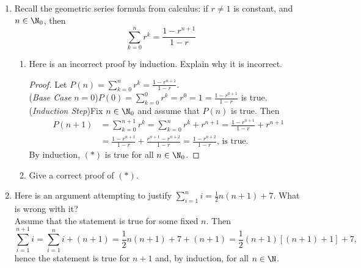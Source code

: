 \begin{exercises}{}{}
\begin{enumerate}
	\item Recall the geometric series formula from calculus: if $r\neq 1$ is constant, and $n\in\N_0$, then
	\[\sum_{k=0}^nr^k=\frac{1-r^{n+1}}{1-r}\tag*{$(\ast)$}\]
	\begin{enumerate}
	  \item Here is an incorrect proof by induction. Explain why it is incorrect.
	  \begin{proof}
	  Let $P(n)=\sum\limits_{k=0}^nr^k=\frac{1-r^{n+1}}{1-r}$.\\
	  (\emph{Base Case} $n=0$)\quad $P(0)=\sum\limits_{k=0}^0r^k=r^0=1=\frac{1-r^{0+1}}{1-r}$ is true.\\
	  (\emph{Induction Step})\quad Fix $n\in\N_0$ and assume that $P(n)$ is true. Then
	  \begin{align*}
	  P(n+1)&=\sum_{k=0}^{n+1}r^k=\sum_{k=0}^nr^k+r^{n+1}=\frac{1-r^{n+1}}{1-r}+r^{n+1}\\
	  &=\frac{1-r^{n+1}}{1-r}+\frac{r^{n+1}-r^{n+2}}{1-r}=\frac{1-r^{n+2}}{1-r}\text{, \ is true.}
	  \end{align*}
	  By induction, $(\ast)$ is true for all $n\in\N_0$.
	  \end{proof}
	  \item Give a correct proof of $(\ast)$.
	\end{enumerate}
	
  \item Here is an argument attempting to justify $\sum\limits_{i=1}^ni=\frac 12n(n+1)+7$. What is wrong with it?\\[5pt]
	Assume that the statement is true for some fixed $n$. Then
	\[\sum_{i=1}^{n+1}i=\sum_{i=1}^ni+(n+1)=\frac 12n(n+1)+7+(n+1)=\frac 12(n+1)[(n+1)+1]+7,\]
	hence the statement is true for $n+1$ and, by induction, for all $n\in\N$.
 	
	

\end{enumerate}
\end{exercises}
